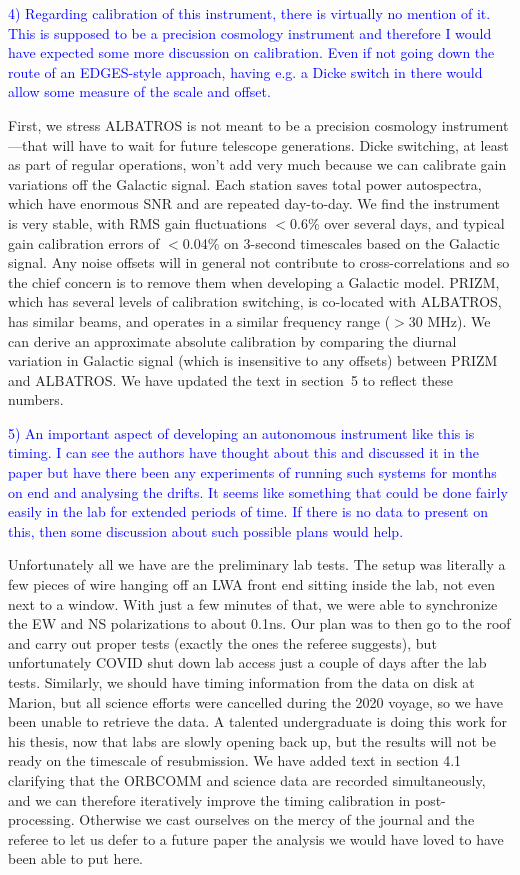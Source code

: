 \documentclass[11pt]{article}
\begin{document}
\noindent \textcolor{blue}{4) Regarding calibration of this
  instrument, there is virtually no mention of it. This is supposed to
  be a precision cosmology instrument and therefore I would have
  expected some more discussion on calibration. Even if not going down
  the route of an EDGES-style approach, having e.g. a Dicke switch in
  there would allow some measure of the scale and offset.}

First, we stress ALBATROS is not meant to be a precision cosmology
instrument---that will have to wait for future telescope generations.
Dicke switching, at least as part of regular operations, won't add
very much because we can calibrate gain variations off the Galactic
signal.  Each station saves total power autospectra, which have
enormous SNR and are repeated day-to-day.  We find the instrument is
very stable, with RMS gain fluctuations $<$0.6\% over several days,
and typical gain calibration errors of $<$0.04\% on 3-second
timescales based on the Galactic signal.  Any noise offsets will in
general not contribute to cross-correlations and so the chief concern
is to remove them when developing a Galactic model.  PRIZM, which has
several levels of calibration switching, is co-located with ALBATROS,
has similar beams, and operates in a similar frequency range ($>$30
MHz).  We can derive an approximate absolute calibration by comparing
the diurnal variation in Galactic signal (which is insensitive to any
offsets) between PRIZM and ALBATROS.  We have updated the text in
section~5 to reflect these numbers.

\noindent \textcolor{blue}{5) An important aspect of developing an
  autonomous instrument like this is timing. I can see the authors
  have thought about this and discussed it in the paper but have there
  been any experiments of running such systems for months on end and
  analysing the drifts. It seems like something that could be done
  fairly easily in the lab for extended periods of time. If there is
  no data to present on this, then some discussion about such possible
  plans would help.}

Unfortunately all we have are the preliminary lab tests.  The setup
was literally a few pieces of wire hanging off an LWA front end
sitting inside the lab, not even next to a window.  With just a few
minutes of that, we were able to synchronize the EW and NS
polarizations to about 0.1ns.  Our plan was to then go to the roof and
carry out proper tests (exactly the ones the referee suggests), but
unfortunately COVID shut down lab access just a couple of days after
the lab tests.  Similarly, we should have timing information from the
data on disk at Marion, but all science efforts were cancelled during
the 2020 voyage, so we have been unable to retrieve the data.  A
talented undergraduate is doing this work for his thesis, now that
labs are slowly opening back up, but the results will not be ready on
the timescale of resubmission.  We have added text in section 4.1
clarifying that the ORBCOMM and science data are recorded
simultaneously, and we can therefore iteratively improve the timing
calibration in post-processing.  Otherwise we cast ourselves on the
mercy of the journal and the referee to let us defer to a future paper
the analysis we would have loved to have been able to put here.
\end{document}
